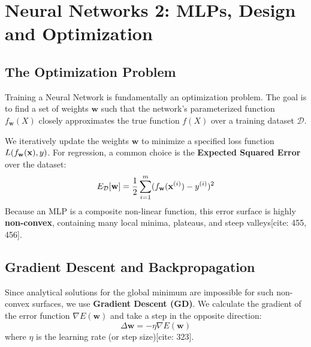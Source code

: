 \chapter*{Neural Networks 2: MLPs, Design and Optimization}

\section*{The Optimization Problem}

Training a Neural Network is fundamentally an optimization problem. The goal is to find a set of weights $\mathbf{w}$ such that the network's parameterized function $f_{\mathbf{w}}(X)$ closely approximates the true function $f(X)$ over a training dataset $\mathcal{D}$.

\begin{definition}
We iteratively update the weights $\mathbf{w}$ to minimize a specified loss function $L(f_{\mathbf{w}}(\mathbf{x}), y)$. For regression, a common choice is the \textbf{Expected Squared Error} over the dataset:
$$E_{\mathcal{D}}[\mathbf{w}] = \frac{1}{2} \sum_{i=1}^{m} (f_{\mathbf{w}}(\mathbf{x}^{(i)}) - y^{(i)})^2$$
Because an MLP is a composite non-linear function, this error surface is highly \textbf{non-convex}, containing many local minima, plateaus, and steep valleys[cite: 455, 456].
\end{definition}

\section*{Gradient Descent and Backpropagation}

Since analytical solutions for the global minimum are impossible for such non-convex surfaces, we use \textbf{Gradient Descent (GD)}. We calculate the gradient of the error function $\nabla E(\mathbf{w})$ and take a step in the opposite direction:
$$\Delta \mathbf{w} = -\eta \nabla E(\mathbf{w})$$
where $\eta$ is the learning rate (or step size)[cite: 323].

